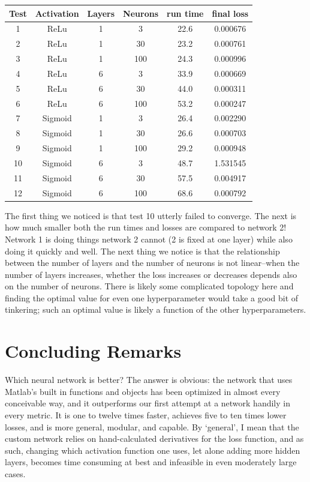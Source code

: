 \documentclass[reqno,14pt]{amsart}
\theoremstyle{plain}
\theoremstyle{definition}
\theoremstyle{remark}
\begin{document}
\begin{center}
\begin{tabular}{||c c c c c c||} 
 \hline
 Test & Activation & Layers & Neurons & run time & final loss \\ [0.5ex] 
 \hline\hline
 1 & ReLu & 1 & 3 & 22.6 & 0.000676\\ 
 \hline
 2 & ReLu & 1 & 30  & 23.2 & 0.000761\\
 \hline
 3 & ReLu & 1 & 100 & 24.3 & 0.000996\\
 \hline
 4 & ReLu & 6 & 3  & 33.9 & 0.000669\\
 \hline
 5 & ReLu & 6 & 30  & 44.0 & 0.000311\\
 \hline
 6 & ReLu & 6 & 100 & 53.2 & 0.000247\\
 \hline 
 7 & Sigmoid & 1 & 3  & 26.4 & 0.002290\\ 
 \hline
 8 & Sigmoid & 1 & 30 & 26.6 & 0.000703\\
 \hline
 9 & Sigmoid & 1 & 100  & 29.2 & 0.000948\\
 \hline
 10 & Sigmoid & 6 & 3  & 48.7 & 1.531545\\
 \hline
 11 & Sigmoid & 6 & 30  & 57.5 & 0.004917\\
 \hline
 12 & Sigmoid & 6 & 100  & 68.6 & 0.000792\\
 \hline 
\end{tabular}
\end{center}

The first thing we noticed is that test 10 utterly failed to converge. The next is how much smaller both the run times and losses are compared to network 2! Network 1 is doing things network 2 cannot (2 is fixed at one layer) while also doing it quickly and well. The next thing we notice is that the relationship between the number of layers and the number of neurons is not linear--when the number of layers increases, whether the loss increases or decreases depends also on the number of neurons. There is likely some complicated topology here and finding the optimal value for even one hyperparameter would take a good bit of tinkering; such an optimal value is likely a function of the other hyperparameters.\\

\section{Concluding Remarks}
Which neural network is better? The answer is obvious: the network that uses Matlab's built in functions and objects has been optimized in almost every conceivable way, and it outperforms our first attempt at a network handily in every metric. It is one to twelve times faster, achieves five to ten times lower losses, and is more general, modular, and capable. By `general', I mean that the custom network relies on hand-calculated derivatives for the loss function, and as such, changing which activation function one uses, let alone adding more hidden layers, becomes time consuming at best and infeasible in even moderately large cases.\\
\end{document}
